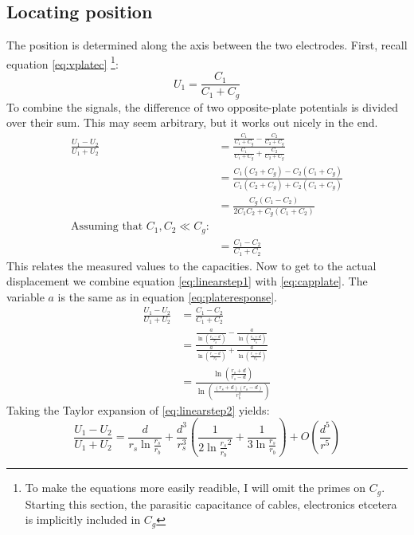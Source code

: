 \subsection{Locating position}
The position is determined along the axis between the two electrodes. First, recall equation \ref{eq:vplatec} \footnote{To make the equations more easily readible, I will omit the primes on $C_g$. Starting this section, the parasitic capacitance of cables, electronics etcetera is implicitly included in $C_g$}:
\begin{equation*}
U_1=\frac{C_1}{C_1+C_g}
\end{equation*}
To combine the signals, the difference of two opposite-plate potentials is divided over their sum. This may seem arbitrary, but it works out nicely in the end.
\begin{align}
\frac{U_1-U_2}{U_1+U_2} &= \frac{\frac{C_1}{C_1+C_g}-\frac{C_2}{C_2+C_g}}{\frac{C_1}{C_1+C_g}+\frac{C_2}{C_2+C_g}} \nonumber \\
&= \frac{C_1(C_2+C_g)-C_2(C_1+C_g)}{C_1(C_2+C_g)+C_2(C_1+C_g)} \nonumber \\
&= \frac{C_g(C_1-C_2)}{2C_1C_2+C_g(C_1+C_2)} \nonumber  \\
\text{Assuming that $C_1,C_2 \ll C_g$:} \nonumber \\
&= \frac{C_1-C_2}{C_1+C_2} \label{eq:linearstep1}
\end{align}
This relates the measured values to the capacities. Now to get to the actual displacement we combine equation \ref{eq:linearstep1} with \ref{eq:capplate}. The variable $a$ is the same as in equation \ref{eq:plateresponse}.
\begin{align}
\frac{U_1-U_2}{U_1+U_2} &= \frac{C_1-C_2}{C_1+C_2} \nonumber \\
&= \frac{\frac{a}{\ln\left(\frac{r_s-d}{r_b}\right)}-\frac{a}{\ln\left(\frac{r_s+d}{r_b}\right)}}{\frac{a}{\ln\left(\frac{r_s-d}{r_b}\right)}+\frac{a}{\ln\left(\frac{r_s+d}{r_b}\right)}} \nonumber \\
&= \frac{\ln\left(\frac{r_s+d}{r_s-d}\right)}{\ln\left(\frac{(r_s+d)(r_s-d)}{r_b^2}\right)}\label{eq:linearstep2}
\end{align}
Taking the Taylor expansion of \ref{eq:linearstep2} yields:
\begin{equation}
\frac{U_1-U_2}{U_1+U_2}=\frac{d}{r_s\ln\frac{r_s}{r_b}} + \frac{d^3}{r_s^3}\left(\frac{1}{2\ln\frac{r_s}{r_b}^2}+\frac{1}{3\ln\frac{r_s}{r_b}}\right)+O(\frac{d^5}{r^5}) \label{eq:linearstep3}
\end{equation}
